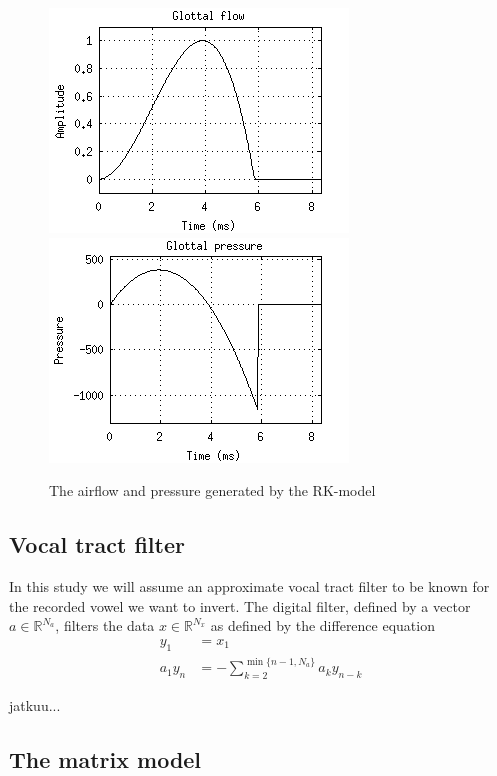 \documentclass[12pt,a4]{article}
\newcommand{\R}{{\mathbb R}}
\begin{document}
\begin{figure}[t]
\begin{center}
\includegraphics[scale=1]{img/klattflow.png}
\includegraphics[scale=1]{img/klattpres.png}
\end{center}
\caption{The airflow and pressure generated by the RK-model}
\label{fig:klatt}
\end{figure}


\subsection{Vocal tract filter}
\label{sec:filter}

In this study we will assume an approximate vocal tract filter to be known for the recorded vowel we want to invert. The digital filter, defined by a vector $a \in \R^{N_a}$, filters the data $x \in \R^{N_x}$ as defined by the difference equation
\begin{align}
y_1     &= x_1 \\
a_1 y_n &= -\sum_{k=2}^{\min\{n-1, N_a\}} a_{k} y_{n-k}
\end{align}

jatkuu...


\subsection{The matrix model}
\label{sec:matrixModel}
\end{document}

